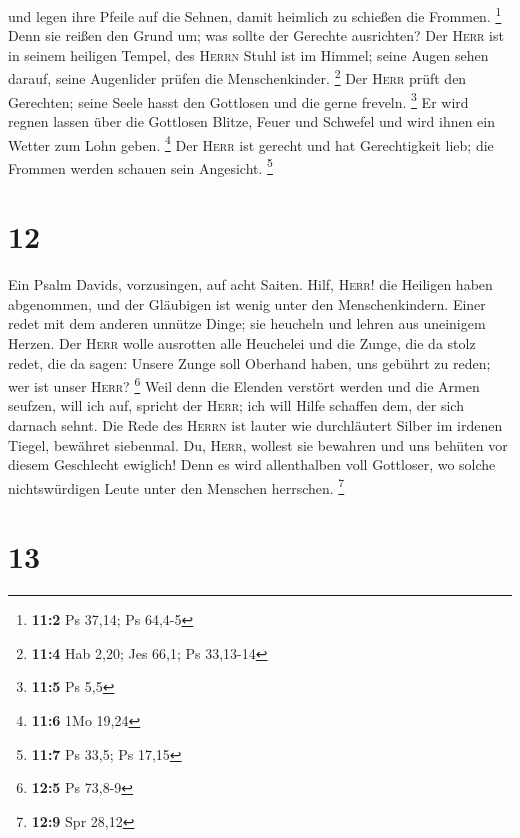 und legen ihre Pfeile auf die Sehnen, damit heimlich zu schießen die
Frommen. \footnote{\textbf{11:2} Ps 37,14; Ps 64,4-5} 
Denn sie reißen den Grund um; was sollte der Gerechte ausrichten?
 Der \textsc{Herr} ist in seinem heiligen Tempel, des
\textsc{Herrn} Stuhl ist im Himmel; seine Augen sehen darauf, seine
Augenlider prüfen die Menschenkinder. \footnote{\textbf{11:4} Hab 2,20;
  Jes 66,1; Ps 33,13-14}  Der \textsc{Herr} prüft den
Gerechten; seine Seele hasst den Gottlosen und die gerne freveln.
\footnote{\textbf{11:5} Ps 5,5}  Er wird regnen lassen
über die Gottlosen Blitze, Feuer und Schwefel und wird ihnen ein Wetter
zum Lohn geben. \footnote{\textbf{11:6} 1Mo 19,24}  Der
\textsc{Herr} ist gerecht und hat Gerechtigkeit lieb; die Frommen werden
schauen sein Angesicht. \footnote{\textbf{11:7} Ps 33,5; Ps 17,15}

\hypertarget{section-6}{%
\section{12}\label{section-6}}

 Ein Psalm Davids, vorzusingen, auf acht Saiten.
 Hilf, \textsc{Herr}! die Heiligen haben abgenommen, und
der Gläubigen ist wenig unter den Menschenkindern.  Einer
redet mit dem anderen unnütze Dinge; sie heucheln und lehren aus
uneinigem Herzen.  Der \textsc{Herr} wolle ausrotten alle
Heuchelei und die Zunge, die da stolz redet,  die da
sagen: Unsere Zunge soll Oberhand haben, uns gebührt zu reden; wer ist
unser \textsc{Herr}? \footnote{\textbf{12:5} Ps 73,8-9} 
Weil denn die Elenden verstört werden und die Armen seufzen, will ich
auf, spricht der \textsc{Herr}; ich will Hilfe schaffen dem, der sich
darnach sehnt.  Die Rede des \textsc{Herrn} ist lauter wie
durchläutert Silber im irdenen Tiegel, bewähret siebenmal.
 Du, \textsc{Herr}, wollest sie bewahren und uns behüten
vor diesem Geschlecht ewiglich!  Denn es wird allenthalben
voll Gottloser, wo solche nichtswürdigen Leute unter den Menschen
herrschen. \footnote{\textbf{12:9} Spr 28,12}

\hypertarget{section-7}{%
\section{13}\label{section-7}}

